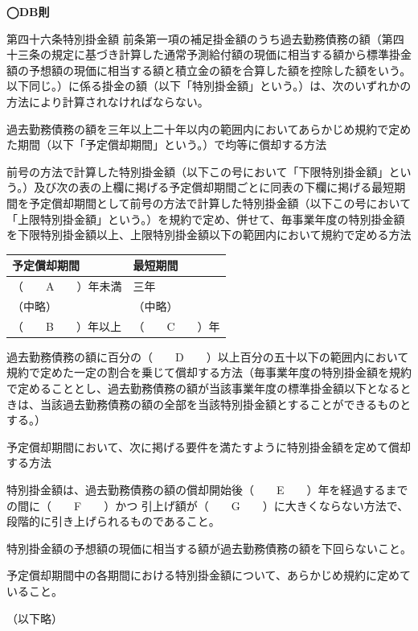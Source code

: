 \begin{fillblank}[数理人試験 H24 問題1(4)]
    \noindent \textbf{◯DB則}
  \begin{lawstructure}
    \begin{lawarticle}{第四十六条}{特別掛金額}
      前条第一項の補足掛金額のうち過去勤務債務の額（第四十三条の規定に基づき計算した通常予測給付額の現価に相当する額から標準掛金額の予想額の現価に相当する額と積立金の額を合算した額を控除した額をいう。以下同じ。）に係る掛金の額（以下「特別掛金額」という。）は、次のいずれかの方法により計算されなければならない。

      過去勤務債務の額を三年以上二十年以内の範囲内においてあらかじめ規約で定めた期間（以下「予定償却期間」という。）で均等に償却する方法

      前号の方法で計算した特別掛金額（以下この号において「下限特別掛金額」という。）及び次の表の上欄に掲げる予定償却期間ごとに同表の下欄に掲げる最短期間を予定償却期間として前号の方法で計算した特別掛金額（以下この号において「上限特別掛金額」という。）を規約で定め、併せて、毎事業年度の特別掛金額を下限特別掛金額以上、上限特別掛金額以下の範囲内において規約で定める方法
      \begin{table}[htbp]
        \centering
        \begin{tabular}{|l|l|} \hline
          予定償却期間 & 最短期間 \\ \hline
          （　　A　　）年未満 & 三年 \\ \hline
          （中略） & （中略） \\ \hline
          （　　B　　）年以上 & （　　C　　）年 \\ \hline
        \end{tabular}
      \end{table}

      過去勤務債務の額に百分の（　　D　　）以上百分の五十以下の範囲内において規約で定めた一定の割合を乗じて償却する方法（毎事業年度の特別掛金額を規約で定めることとし、過去勤務債務の額が当該事業年度の標準掛金額以下となるときは、当該過去勤務債務の額の全部を当該特別掛金額とすることができるものとする。）

      予定償却期間において、次に掲げる要件を満たすように特別掛金額を定めて償却する方法

      特別掛金額は、過去勤務債務の額の償却開始後（　　E　　）年を経過するまでの間に（　　F　　）かつ
      引上げ額が（　　G　　）に大きくならない方法で、段階的に引き上げられるものであること。
    
      特別掛金額の予想額の現価に相当する額が過去勤務債務の額を下回らないこと。

      予定償却期間中の各期間における特別掛金額について、あらかじめ規約に定めていること。


      （以下略）
    \end{lawarticle}
  \end{lawstructure}
\end{fillblank}

